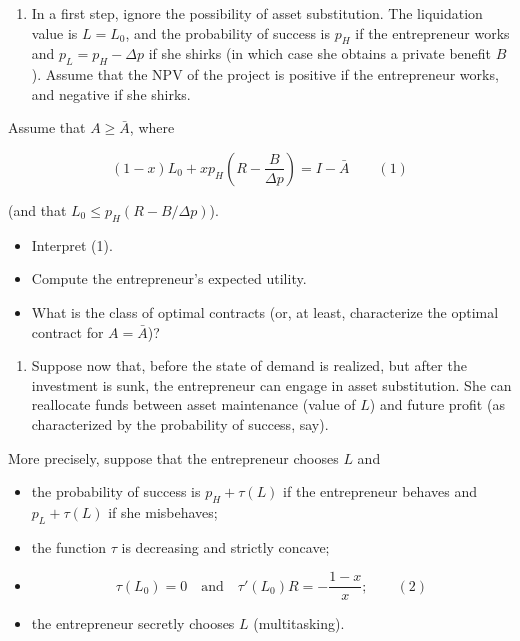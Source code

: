 \documentclass[11pt,a4paper]{article}
\providecommand{\tightlist}{\setlength{\itemsep}{0pt}\setlength{\parskip}{0pt}}
\begin{document}
\begin{enumerate}
\def\labelenumi{(\roman{enumi})}
\tightlist
\item
  In a first step, ignore the possibility of asset substitution. The liquidation value is
  \(L = L_0\), and the probability of success is \(p_H\) if the entrepreneur works and
  \(p_L = p_H - \Delta p\) if she shirks (in which case she obtains a private benefit \(B\)). Assume
  that the NPV of the project is positive if the entrepreneur works, and negative if she shirks.
\end{enumerate}

Assume that \(A \geqslant \bar A\), where

\[(1 - x)L_0 + x p_H\left(R - \frac{B}{\Delta p}\right) = I - \bar A \qquad (1)\]

(and that \(L_0 \leqslant p_H(R - B/\Delta p)\)).

\begin{itemize}
\tightlist
\item
  Interpret (1).
\item
  Compute the entrepreneur's expected utility.
\item
  What is the class of optimal contracts (or, at least, characterize the optimal contract for
  \(A = \bar A\))?
\end{itemize}

\begin{enumerate}
\def\labelenumi{(\roman{enumi})}
\setcounter{enumi}{1}
\tightlist
\item
  Suppose now that, before the state of demand is realized, but after the investment is sunk, the
  entrepreneur can engage in asset substitution. She can reallocate funds between asset maintenance
  (value of \(L\)) and future profit (as characterized by the probability of success, say).
\end{enumerate}

More precisely, suppose that the entrepreneur chooses \(L\) and

\begin{itemize}
\tightlist
\item
  the probability of success is \(p_H + \tau(L)\) if the entrepreneur behaves and \(p_L + \tau(L)\)
  if she misbehaves;
\item
  the function \(\tau\) is decreasing and strictly concave;
\item
  \[\tau(L_0) = 0 \quad \text{and} \quad \tau'(L_0)R = -\frac{1 - x}{x}; \qquad (2)\]
\item
  the entrepreneur secretly chooses \(L\) (multitasking).
\end{itemize}
\end{document}
